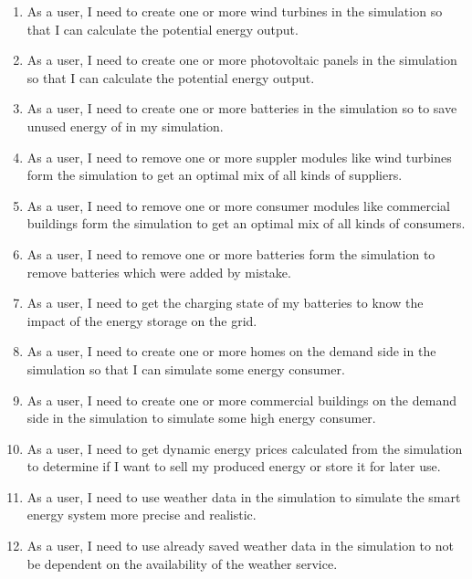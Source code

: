 \begin{enumerate}
\item As a user, I need to create one or more wind turbines in the simulation so that I can calculate the potential energy output.

\item As a user, I need to create one or more photovoltaic panels in the simulation so that I can calculate the potential energy output.

\item As a user, I need to create one or more batteries in the simulation so to save unused energy of in my simulation.

\item As a user, I need to remove one or more suppler modules like wind turbines form the simulation to get an optimal mix of all kinds of suppliers.

\item As a user, I need to remove one or more consumer modules like commercial buildings form the simulation to get an optimal mix of all kinds of consumers.

\item As a user, I need to remove one or more batteries form the simulation to remove batteries which were added by mistake.

\item As a user, I need to get the charging state of my batteries to know the impact of the energy storage on the grid.

\item As a user, I need to create one or more homes on the demand side in the simulation so that I can simulate some energy consumer.

\item As a user, I need to create one or more commercial buildings on the demand side in the simulation to simulate some high energy consumer.

\item As a user, I need to get dynamic energy prices calculated from the simulation to determine if I want to sell my produced energy or store it for later use.

\item As a user, I need to use weather data in the simulation to simulate the smart energy system more precise and realistic.

\item As a user, I need to use already saved weather data in the simulation to not be dependent on the availability of the weather service.


\end{enumerate}
